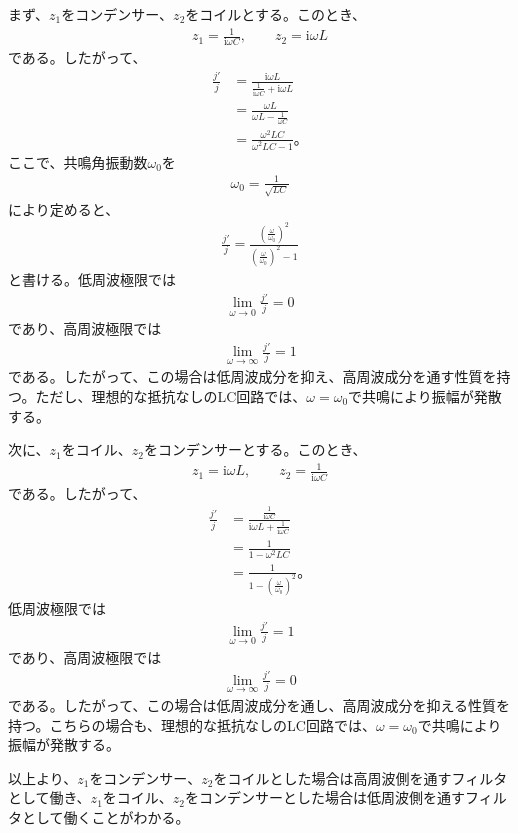 \documentclass[platex,dvipdfmx,a4paper]{jsarticle}
\begin{document}
  まず、$z_1$をコンデンサー、$z_2$をコイルとする。このとき、
  \begin{align*}
    z_1=\frac{1}{\mathrm{i}\omega C},\qquad
    z_2=\mathrm{i}\omega L
  \end{align*}
  である。したがって、
  \begin{align*}
    \frac{j'}{j}
    &=\frac{\mathrm{i}\omega L}{\frac{1}{\mathrm{i}\omega C}+\mathrm{i}\omega L} \\
    &=\frac{\omega L}{\omega L-\frac{1}{\omega C}} \\
    &=\frac{\omega^2LC}{\omega^2LC-1}。
  \end{align*}
  ここで、共鳴角振動数$\omega_0$を
  \begin{align*}
    \omega_0=\frac{1}{\sqrt{LC}}
  \end{align*}
  により定めると、
  \begin{align*}
    \frac{j'}{j}
    =\frac{\left(\frac{\omega}{\omega_0}\right)^2}{\left(\frac{\omega}{\omega_0}\right)^2-1}
  \end{align*}
  と書ける。低周波極限では
  \begin{align*}
    \lim_{\omega\to0}\frac{j'}{j}=0
  \end{align*}
  であり、高周波極限では
  \begin{align*}
    \lim_{\omega\to\infty}\frac{j'}{j}=1
  \end{align*}
  である。したがって、この場合は低周波成分を抑え、高周波成分を通す性質を持つ。ただし、理想的な抵抗なしのLC回路では、$\omega=\omega_0$で共鳴により振幅が発散する。

  次に、$z_1$をコイル、$z_2$をコンデンサーとする。このとき、
  \begin{align*}
    z_1=\mathrm{i}\omega L,\qquad
    z_2=\frac{1}{\mathrm{i}\omega C}
  \end{align*}
  である。したがって、
  \begin{align*}
    \frac{j'}{j}
    &=\frac{\frac{1}{\mathrm{i}\omega C}}{\mathrm{i}\omega L+\frac{1}{\mathrm{i}\omega C}} \\
    &=\frac{1}{1-\omega^2LC} \\
    &=\frac{1}{1-\left(\frac{\omega}{\omega_0}\right)^2}。
  \end{align*}
  低周波極限では
  \begin{align*}
    \lim_{\omega\to0}\frac{j'}{j}=1
  \end{align*}
  であり、高周波極限では
  \begin{align*}
    \lim_{\omega\to\infty}\frac{j'}{j}=0
  \end{align*}
  である。したがって、この場合は低周波成分を通し、高周波成分を抑える性質を持つ。こちらの場合も、理想的な抵抗なしのLC回路では、$\omega=\omega_0$で共鳴により振幅が発散する。

  以上より、$z_1$をコンデンサー、$z_2$をコイルとした場合は高周波側を通すフィルタとして働き、$z_1$をコイル、$z_2$をコンデンサーとした場合は低周波側を通すフィルタとして働くことがわかる。
\end{document}
